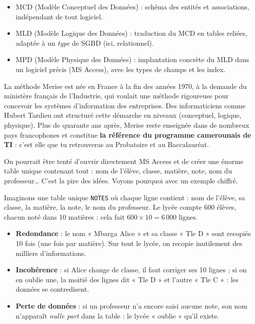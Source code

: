 \documentclass[11pt]{article}
\newcommand{\cle}[1]{{\popxbold\color{popdark}#1}}
\newcounter{popsec}
\newcounter{popsub}
\newcommand{\courssub}[1]{%
  \stepcounter{popsub}%
  \par\vspace{9pt}\noindent{\popxbold\fontsize{11.5}{13}\selectfont\color{popink}{\color{poporange}\thepopsec.\thepopsub}\hspace{6pt}#1}\par\nopagebreak\vspace{4pt}
}
\begin{document}
\begin{propriete}
\begin{itemize}
\item \cle{MCD} (Modèle Conceptuel des Données) : schéma des entités et associations, indépendant de tout logiciel.
\item \cle{MLD} (Modèle Logique des Données) : traduction du MCD en tables reliées, adaptée à un \emph{type} de SGBD (ici, relationnel).
\item \cle{MPD} (Modèle Physique des Données) : implantation concrète du MLD dans un logiciel précis (MS Access), avec les types de champs et les index.
\end{itemize}
\end{propriete}

\begin{savaistu}
La méthode \cle{Merise} est née en France à la fin des années 1970, à la demande du ministère français de l'Industrie, qui voulait une méthode rigoureuse pour concevoir les systèmes d'information des entreprises. Des informaticiens comme Hubert Tardieu ont structuré cette démarche en niveaux (conceptuel, logique, physique). Plus de quarante ans après, Merise reste enseignée dans de nombreux pays francophones et constitue \textbf{la référence du programme camerounais de TI} : c'est elle que tu retrouveras au Probatoire et au Baccalauréat.
\end{savaistu}

\courssub{Pourquoi modéliser avant de coder ?}

On pourrait être tenté d'ouvrir directement MS Access et de créer une énorme table unique contenant tout : nom de l'élève, classe, matière, note, nom du professeur\ldots{} C'est la pire des idées. Voyons pourquoi avec un exemple chiffré.

\begin{exemplebox}
Imaginons une table unique \texttt{NOTES} où chaque ligne contient : nom de l'élève, sa classe, la matière, la note, le nom du professeur. Le lycée compte 600 élèves, chacun noté dans 10 matières : cela fait $600 \times 10 = 6\,000$ lignes.
\begin{itemize}
\item \textbf{Redondance} : le nom « Mbarga Alice » et sa classe « Tle D » sont recopiés 10 fois (une fois par matière). Sur tout le lycée, on recopie inutilement des milliers d'informations.
\item \textbf{Incohérence} : si Alice change de classe, il faut corriger ses 10 lignes ; si on en oublie une, la moitié des lignes dit « Tle D » et l'autre « Tle C » : les données se contredisent.
\item \textbf{Perte de données} : si un professeur n'a encore saisi aucune note, son nom n'apparaît \emph{nulle part} dans la table : le lycée « oublie » qu'il existe.
\end{itemize}
\end{exemplebox}
\end{document}
